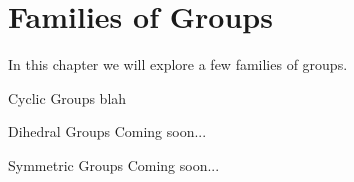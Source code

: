 \chapter{Families of Groups}
\label{chapter:families}
\thispagestyle{empty}

In this chapter we will explore a few families of groups.

\begin{section}{Cyclic Groups}
blah
\end{section}

\begin{section}{Dihedral Groups}
Coming soon...
\end{section}

\begin{section}{Symmetric Groups}
Coming soon...
\end{section}

